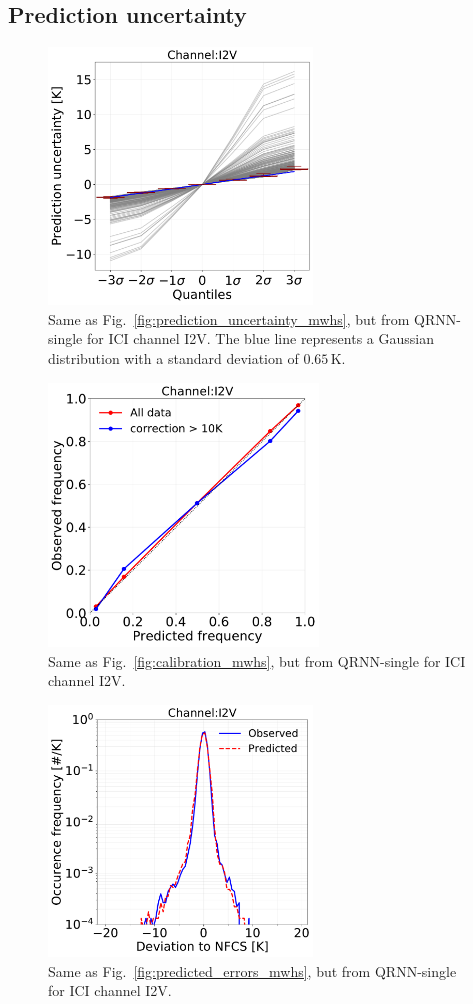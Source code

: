 \documentclass[amt, manuscript]{copernicus}
\begin{document}
\subsection{Prediction uncertainty}
\label{sec:prediction_uncertainty}
\begin{figure}[t]
	\includegraphics[width = 70mm]{Figures/fig09.pdf}	
	\caption{Same as Fig.~\ref{fig:prediction_uncertainty_mwhs}, but from QRNN-single for ICI channel I2V. The blue line represents a Gaussian distribution with a standard deviation of $0.65$\,K.}
	\label{fig:prediction_uncertainty_I2V}	
\end{figure}
\begin{figure}[t]
	\includegraphics[height = 70mm]{Figures/fig10.pdf}	
	\caption{Same as Fig.~\ref{fig:calibration_mwhs}, but from QRNN-single for ICI channel I2V. }
	\label{fig:calibration_I2V}	
\end{figure}
\begin{figure}[t]
	\includegraphics[width=70mm]{Figures/fig11.pdf}	
	\caption{Same as Fig.~\ref{fig:predicted_errors_mwhs}, but from QRNN-single for ICI channel I2V.}
	\label{fig:predicted_errors}	
\end{figure}
\end{document}
